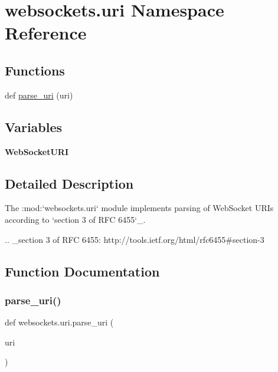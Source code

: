 \hypertarget{namespacewebsockets_1_1uri}{}\section{websockets.\+uri Namespace Reference}
\label{namespacewebsockets_1_1uri}
\subsection*{Functions}
\begin{DoxyCompactItemize}
\item 
def \hyperlink{namespacewebsockets_1_1uri_abc2223b9dcef8e93c5d8bc5d705d434a}{parse\+\_\+uri} (uri)
\end{DoxyCompactItemize}
\subsection*{Variables}
\begin{DoxyCompactItemize}
\item 
{\bfseries Web\+Socket\+U\+RI}
\end{DoxyCompactItemize}


\subsection{Detailed Description}
\begin{DoxyVerb}The :mod:`websockets.uri` module implements parsing of WebSocket URIs
according to `section 3 of RFC 6455`_.

.. _section 3 of RFC 6455: http://tools.ietf.org/html/rfc6455#section-3\end{DoxyVerb}
 

\subsection{Function Documentation}
\mbox{\label{namespacewebsockets_1_1uri_abc2223b9dcef8e93c5d8bc5d705d434a}} 
\subsubsection{\texorpdfstring{parse\+\_\+uri()}{parse\_uri()}}
{\footnotesize\ttfamily def websockets.\+uri.\+parse\+\_\+uri (\begin{DoxyParamCaption}\item[{}]{uri }\end{DoxyParamCaption})}

